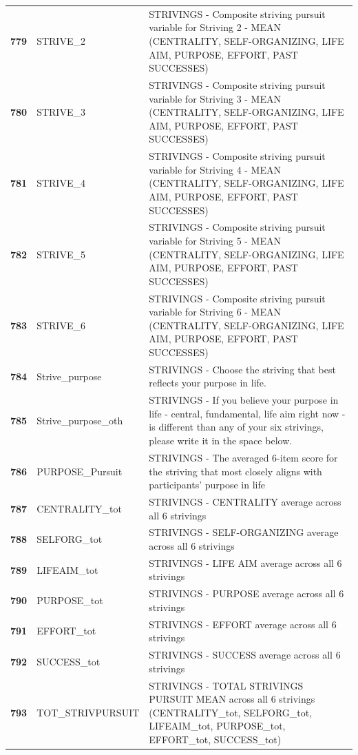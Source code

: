 \documentclass[
  letterpaper,
  DIV=11,
  numbers=noendperiod]{scrartcl}
\begin{document}
\begin{longtable}[t]{>{}cll}
\textbf{779} & STRIVE\_2 & STRIVINGS - Composite striving pursuit variable for Striving 2 - MEAN (CENTRALITY, SELF-ORGANIZING, LIFE AIM, PURPOSE, EFFORT, PAST SUCCESSES)\\
\textbf{780} & STRIVE\_3 & STRIVINGS - Composite striving pursuit variable for Striving 3 - MEAN (CENTRALITY, SELF-ORGANIZING, LIFE AIM, PURPOSE, EFFORT, PAST SUCCESSES)\\
\addlinespace
\textbf{781} & STRIVE\_4 & STRIVINGS - Composite striving pursuit variable for Striving 4 - MEAN (CENTRALITY, SELF-ORGANIZING, LIFE AIM, PURPOSE, EFFORT, PAST SUCCESSES)\\
\textbf{782} & STRIVE\_5 & STRIVINGS - Composite striving pursuit variable for Striving 5 - MEAN (CENTRALITY, SELF-ORGANIZING, LIFE AIM, PURPOSE, EFFORT, PAST SUCCESSES)\\
\textbf{783} & STRIVE\_6 & STRIVINGS - Composite striving pursuit variable for Striving 6 - MEAN (CENTRALITY, SELF-ORGANIZING, LIFE AIM, PURPOSE, EFFORT, PAST SUCCESSES)\\
\textbf{784} & Strive\_purpose & STRIVINGS - Choose the striving that best reflects your purpose in life.\\
\textbf{785} & Strive\_purpose\_oth & STRIVINGS - If you believe your purpose in life - central, fundamental, life aim right now - is different than any of your six strivings, please write it in the space below.\\
\addlinespace
\textbf{786} & PURPOSE\_Pursuit & STRIVINGS - The averaged 6-item score for the striving that most closely aligns with participants' purpose in life\\
\textbf{787} & CENTRALITY\_tot & STRIVINGS - CENTRALITY average across all 6 strivings\\
\textbf{788} & SELFORG\_tot & STRIVINGS - SELF-ORGANIZING average across all 6 strivings\\
\textbf{789} & LIFEAIM\_tot & STRIVINGS - LIFE AIM average across all 6 strivings\\
\textbf{790} & PURPOSE\_tot & STRIVINGS - PURPOSE average across all 6 strivings\\
\addlinespace
\textbf{791} & EFFORT\_tot & STRIVINGS - EFFORT average across all 6 strivings\\
\textbf{792} & SUCCESS\_tot & STRIVINGS - SUCCESS average across all 6 strivings\\
\textbf{793} & TOT\_STRIVPURSUIT & STRIVINGS - TOTAL STRIVINGS PURSUIT MEAN across all 6 strivings (CENTRALITY\_tot, SELFORG\_tot, LIFEAIM\_tot, PURPOSE\_tot, EFFORT\_tot, SUCCESS\_tot)\\

\end{longtable}
\end{document}
